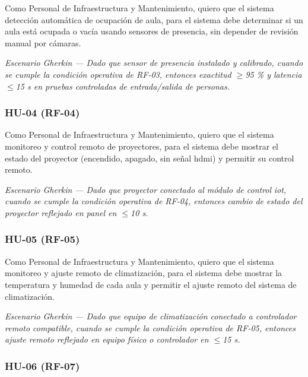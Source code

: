 
Como Personal de Infraestructura y Mantenimiento, quiero que el sistema detección automática de ocupación de aula, para el sistema debe determinar si un aula está ocupada o vacía usando sensores de presencia, sin depender de revisión manual por cámaras.


\textit{Escenario }\textit{Gherkin}\textit{ --- Dado que sensor de presencia instalado y calibrado, cuando se cumple la condición operativa de RF-03, entonces exactitud $\geq$95 \% y latencia $\leq$15 s en pruebas controladas de entrada/salida de personas.}


\subsubsection*{HU-04 (RF-04)}


Como Personal de Infraestructura y Mantenimiento, quiero que el sistema monitoreo y control remoto de proyectores, para el sistema debe mostrar el estado del proyector (encendido, apagado, sin señal hdmi) y permitir su control remoto.


\textit{Escenario }\textit{Gherkin}\textit{ --- Dado que proyector conectado al módulo de control }\textit{iot}\textit{, cuando se cumple la condición operativa de RF-04, entonces cambio de estado del proyector reflejado en panel en $\leq$10 s.}


\subsubsection*{HU-05 (RF-05)}


Como Personal de Infraestructura y Mantenimiento, quiero que el sistema monitoreo y ajuste remoto de climatización, para el sistema debe mostrar la temperatura y humedad de cada aula y permitir el ajuste remoto del sistema de climatización.


\textit{Escenario }\textit{Gherkin}\textit{ --- Dado que equipo de climatización conectado a controlador remoto compatible, cuando se cumple la condición operativa de RF-05, entonces ajuste remoto reflejado en equipo físico o controlador en $\leq$15 s.}


\subsubsection*{HU-06 (RF-07)}

